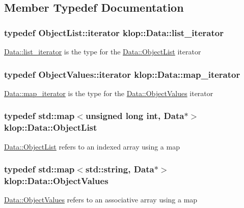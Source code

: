 \subsection{Member Typedef Documentation}
\hypertarget{classklop_1_1Data_a8bcb1ee1639616047953b2459319ea3c}{
\subsubsection[{list\_\-iterator}]{\setlength{\rightskip}{0pt plus 5cm}typedef ObjectList::iterator {\bf klop::Data::list\_\-iterator}}}
\label{classklop_1_1Data_a8bcb1ee1639616047953b2459319ea3c}
\hyperlink{classklop_1_1Data_a8bcb1ee1639616047953b2459319ea3c}{Data::list\_\-iterator} is the type for the \hyperlink{classklop_1_1Data_aee446ab95da6d53fe52203d8ea967742}{Data::ObjectList} iterator \hypertarget{classklop_1_1Data_ae1c3cec24a9d3a5cd53693f5d34195f2}{
\subsubsection[{map\_\-iterator}]{\setlength{\rightskip}{0pt plus 5cm}typedef ObjectValues::iterator {\bf klop::Data::map\_\-iterator}}}
\label{classklop_1_1Data_ae1c3cec24a9d3a5cd53693f5d34195f2}
\hyperlink{classklop_1_1Data_ae1c3cec24a9d3a5cd53693f5d34195f2}{Data::map\_\-iterator} is the type for the \hyperlink{classklop_1_1Data_ab36e5c0e4f3265bb3e1698de7e073d03}{Data::ObjectValues} iterator \hypertarget{classklop_1_1Data_aee446ab95da6d53fe52203d8ea967742}{
\subsubsection[{ObjectList}]{\setlength{\rightskip}{0pt plus 5cm}typedef std::map$<$unsigned long int, {\bf Data}$\ast$$>$ {\bf klop::Data::ObjectList}}}
\label{classklop_1_1Data_aee446ab95da6d53fe52203d8ea967742}
\hyperlink{classklop_1_1Data_aee446ab95da6d53fe52203d8ea967742}{Data::ObjectList} refers to an indexed array using a map \hypertarget{classklop_1_1Data_ab36e5c0e4f3265bb3e1698de7e073d03}{
\subsubsection[{ObjectValues}]{\setlength{\rightskip}{0pt plus 5cm}typedef std::map$<$std::string, {\bf Data}$\ast$$>$ {\bf klop::Data::ObjectValues}}}
\label{classklop_1_1Data_ab36e5c0e4f3265bb3e1698de7e073d03}
\hyperlink{classklop_1_1Data_ab36e5c0e4f3265bb3e1698de7e073d03}{Data::ObjectValues} refers to an associative array using a map 

